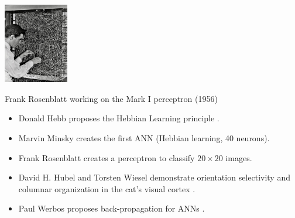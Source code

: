 \documentclass[c,8pt]{beamer}
\begin{document}

\begin{frame}{}{} %



\vspace*{-4ex}

\begin{center}
\includegraphics[height=3.5cm]{pics/Rosenblatt_Mark_I_perceptron_1956.jpg}

Frank Rosenblatt working on the Mark I perceptron (1956)
\end{center}

\vspace*{2ex}

\begin{itemize}
\item<1->[1949 --] Donald Hebb proposes the Hebbian Learning principle
  \citep{hebb-organization-of-behavior-1949}.
\item<1->[1951 --] Marvin Minsky creates the first ANN (Hebbian learning, 40 neurons).
\item<2->[1958 --] Frank Rosenblatt creates a perceptron to classify $20 \times 20$
  images.
\item<3->[1959 --] David H. Hubel and Torsten Wiesel demonstrate
  orientation selectivity and columnar organization in the cat's
  visual cortex \citep{hubel1962receptive}.
\item<4->[1982 --] Paul Werbos proposes back-propagation for ANNs \citep{Werbos1981}.
\end{itemize}


\end{frame}
\end{document}
